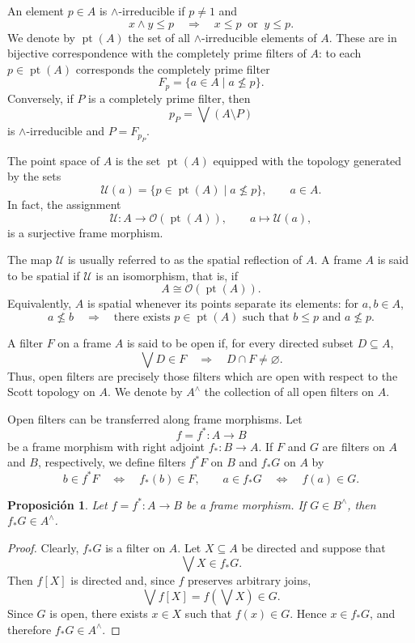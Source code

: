 \documentclass[11pt]{amsart}
\DeclareMathOperator{\pt}{pt}
\theoremstyle{plain}
\newtheorem{prop}[thm]{Proposición}
\theoremstyle{definition}
\begin{document}
An element \(p\in A\) is \(\wedge\)-irreducible if \(p\neq 1\) and
\[
x\wedge y\leq p
\quad\Longrightarrow\quad
x\leq p\ \text{ or }\ y\leq p.
\]
We denote by \(\pt(A)\) the set of all \(\wedge\)-irreducible elements of \(A\). These are in bijective correspondence with the completely prime filters of \(A\): to each \(p\in\pt(A)\) corresponds the completely prime filter
\[
F_p=\{a\in A\mid a\nleq p\}.
\]
Conversely, if \(P\) is a completely prime filter, then
\[
p_P=\bigvee(A\setminus P)
\]
is \(\wedge\)-irreducible and \(P=F_{p_P}\).

The point space of \(A\) is the set \(\pt(A)\) equipped with the topology generated by the sets
\[
\mathcal U(a)=\{p\in\pt(A)\mid a\nleq p\},
\qquad a\in A.
\]In fact, the assignment
\[
\mathcal U\colon A\longrightarrow\mathcal O(\pt(A)),
\qquad
a\longmapsto\mathcal U(a),
\]
is a surjective frame morphism.

The map \(\mathcal U\) is usually referred to as the spatial reflection of \(A\). A frame \(A\) is said to be spatial if \(\mathcal U\) is an isomorphism, that is, if
\[
A\cong\mathcal O(\pt(A)).
\]
Equivalently, \(A\) is spatial whenever its points separate its elements: for \(a,b\in A\),
\[
a\nleq b
\quad\Longrightarrow\quad
\text{there exists }p\in\pt(A)\text{ such that }b\leq p
\text{ and }a\nleq p.
\]

A filter \(F\) on a frame \(A\) is said to be open if, for every directed subset \(D\subseteq A\),
\[
\bigvee D\in F
\quad\Longrightarrow\quad
D\cap F\neq\varnothing.
\]
Thus, open filters are precisely those filters which are open with respect to the Scott topology on \(A\). We denote by \(A^\wedge\) the collection of all open filters on \(A\).

Open filters can be transferred along frame morphisms. Let
\[
f=f^*\colon A\longrightarrow B
\]
be a frame morphism with right adjoint \(f_*\colon B\to A\). If \(F\) and \(G\) are filters on \(A\) and \(B\), respectively, we define filters \(f^*F\) on \(B\) and \(f_*G\) on \(A\) by
\begin{equation}\label{Imagenfiltros}
b\in f^*F\quad\Longleftrightarrow\quad f_*(b)\in F,
\qquad
a\in f_*G\quad\Longleftrightarrow\quad f(a)\in G.
\end{equation}
\begin{prop}\label{fF}
Let $f=f^*\colon A\to B$ be a frame morphism. If $G\in B^\wedge$, then $f_*G\in A^\wedge$.
\end{prop}

\begin{proof}
Clearly, \(f_*G\) is a filter on \(A\). Let \(X\subseteq A\) be directed and suppose that
\[
\bigvee X\in f_*G.
\]
Then \(f[X]\) is directed and, since \(f\) preserves arbitrary joins,
\[
\bigvee f[X]
=f\left(\bigvee X\right)\in G.
\]
Since \(G\) is open, there exists \(x\in X\) such that \(f(x)\in G\). Hence \(x\in f_*G\), and therefore \(f_*G\in A^\wedge\).
\end{proof}
\end{document}
